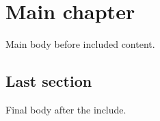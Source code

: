\documentclass{report}
\begin{document}
\chapter{Main chapter}
Main body before included content.

\section{Last section}
Final body after the include.
\end{document}
